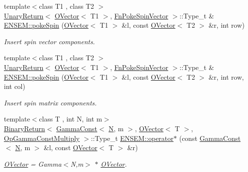 \begin{DoxyCompactItemize}
{\footnotesize template$<$class T1 , class T2 $>$ }\\\mbox{\hyperlink{structENSEM_1_1UnaryReturn}{Unary\+Return}}$<$ \mbox{\hyperlink{classENSEM_1_1OVector}{O\+Vector}}$<$ T1 $>$, \mbox{\hyperlink{structENSEM_1_1FnPokeSpinVector}{Fn\+Poke\+Spin\+Vector}} $>$\+::Type\+\_\+t \& \mbox{\hyperlink{group__obsvector_gadea0fd5400f7060852f3cd990c3a8ab3}{E\+N\+S\+E\+M\+::poke\+Spin}} (\mbox{\hyperlink{classENSEM_1_1OVector}{O\+Vector}}$<$ T1 $>$ \&l, const \mbox{\hyperlink{classENSEM_1_1OVector}{O\+Vector}}$<$ T2 $>$ \&r, int row)
\begin{DoxyCompactList}\small\item\em Insert spin vector components. \end{DoxyCompactList}\item 
{\footnotesize template$<$class T1 , class T2 $>$ }\\\mbox{\hyperlink{structENSEM_1_1UnaryReturn}{Unary\+Return}}$<$ \mbox{\hyperlink{classENSEM_1_1OVector}{O\+Vector}}$<$ T1 $>$, \mbox{\hyperlink{structENSEM_1_1FnPokeSpinVector}{Fn\+Poke\+Spin\+Vector}} $>$\+::Type\+\_\+t \& \mbox{\hyperlink{group__obsvector_ga8b52874ec438b5bc2c6faef41097b352}{E\+N\+S\+E\+M\+::poke\+Spin}} (\mbox{\hyperlink{classENSEM_1_1OVector}{O\+Vector}}$<$ T1 $>$ \&l, const \mbox{\hyperlink{classENSEM_1_1OVector}{O\+Vector}}$<$ T2 $>$ \&r, int row, int col)
\begin{DoxyCompactList}\small\item\em Insert spin matrix components. \end{DoxyCompactList}\item 
{\footnotesize template$<$class T , int N, int m$>$ }\\\mbox{\hyperlink{structENSEM_1_1BinaryReturn}{Binary\+Return}}$<$ \mbox{\hyperlink{classENSEM_1_1GammaConst}{Gamma\+Const}}$<$ \mbox{\hyperlink{operator__name__util_8cc_a7722c8ecbb62d99aee7ce68b1752f337}{N}}, m $>$, \mbox{\hyperlink{classENSEM_1_1OVector}{O\+Vector}}$<$ T $>$, \mbox{\hyperlink{structENSEM_1_1OpGammaConstMultiply}{Op\+Gamma\+Const\+Multiply}} $>$\+::Type\+\_\+t \mbox{\hyperlink{group__obsvector_gaae51a4414b6efe2f47cc4c62841aabf9}{E\+N\+S\+E\+M\+::operator$\ast$}} (const \mbox{\hyperlink{classENSEM_1_1GammaConst}{Gamma\+Const}}$<$ \mbox{\hyperlink{operator__name__util_8cc_a7722c8ecbb62d99aee7ce68b1752f337}{N}}, m $>$ \&l, const \mbox{\hyperlink{classENSEM_1_1OVector}{O\+Vector}}$<$ T $>$ \&r)
\begin{DoxyCompactList}\small\item\em \mbox{\hyperlink{classENSEM_1_1OVector}{O\+Vector}} = Gamma$<$\+N,m$>$ $\ast$ \mbox{\hyperlink{classENSEM_1_1OVector}{O\+Vector}}. \end{DoxyCompactList}\item 

\end{DoxyCompactItemize}

